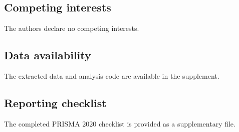 \documentclass[11pt,a4paper]{article}
\begin{document}
\subsection*{Competing interests}
The authors declare no competing interests.

\subsection*{Data availability}
The extracted data and analysis code are available in the supplement.

\subsection*{Reporting checklist}
The completed PRISMA 2020 checklist is provided as a supplementary file.



\end{document}
